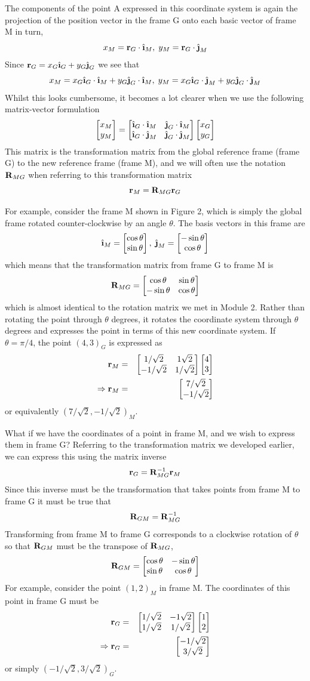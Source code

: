\documentclass[M3_Night6_Solutions]{subfiles}
\begin{document}
The components of the point A expressed in this coordinate system is again the projection of the position vector in the frame G onto each basic vector of frame M in turn,
\[x_M = \r_G \cdot \ihat_M, \; y_M = \r_G \cdot \jhat_M \]
Since $\r_G = x_G \ihat_G + y_G \jhat_G$ we see that
\[x_M = x_G \ihat_G \cdot \ihat_M + y_G \jhat_G \cdot \ihat_M, \; y_M = x_G \ihat_G \cdot \jhat_M + y_G \jhat_G \cdot \jhat_M\]
Whilst this looks cumbersome, it becomes a lot clearer when we use the following matrix-vector formulation
\[\twobyone{x_M}{y_M} = \twobytwo{\ihat_G \cdot \ihat_M}{\jhat_G \cdot \ihat_M}{\ihat_G \cdot \jhat_M}{\jhat_G \cdot \jhat_M} \twobyone{x_G}{y_G}\]
This matrix is the transformation matrix from the global reference frame (frame G) to the new reference frame (frame M), and we will often use the notation $\mathbf{R}_{MG}$ when referring to this transformation matrix
\[\mathbf{r}_M = \mathbf{R}_{MG} \mathbf{r}_G \]

For example, consider the frame M shown in Figure 2, which is simply the global frame rotated counter-clockwise by an angle $\theta$. The basis vectors in this frame are
\[ \ihat_M = \twobyone{\cos \theta}{\sin \theta}, \; \jhat_M = \twobyone{-\sin \theta}{\cos \theta} \]
which means that the transformation matrix from frame G to frame M is
\[\mathbf{R}_{MG} = \begin{bmatrix} \cos \theta & \sin \theta \\ -\sin \theta & \cos \theta\end{bmatrix} \]
which is almost identical to the rotation matrix we met in Module 2. Rather than rotating the point through $\theta$ degrees, it rotates the coordinate system through $\theta$ degrees and expresses the point in terms of this new coordinate system. If $\theta = \pi/4$, the point $(4,3)_G$ is expressed as
\begin{eqnarray*}
\mathbf{r}_M &=& \begin{bmatrix} 1/\sqrt{2} & 1\sqrt{2} \\ -1/\sqrt{2} & 1/\sqrt{2}\end{bmatrix} \begin{bmatrix} 4 \\ 3 \end{bmatrix} \\
\Rightarrow \mathbf{r}_M &=& \begin{bmatrix} 7/\sqrt{2} \\ -1/\sqrt{2} \end{bmatrix}
\end{eqnarray*}
or equivalently $(7/\sqrt{2},-1/\sqrt{2})_M$.

What if we have the coordinates of a point in frame M, and we wish to express them in frame G? Referring to the transformation matrix we developed earlier, we can express this using the matrix inverse
\[\mathbf{r}_G = \mathbf{R}_{MG}^{-1} \mathbf{r}_M \]
Since this inverse must be the transformation that takes points from frame M to frame G it must be true that
\[\mathbf{R}_{GM} = \mathbf{R}_{MG}^{-1} \]
Transforming from frame M to frame G corresponds to a clockwise rotation of $\theta$ so that $\mathbf{R}_{GM}$ must be the transpose of $\mathbf{R}_{MG}$,
\[\mathbf{R}_{GM} = \begin{bmatrix} \cos \theta & -\sin \theta \\ \sin \theta & \cos \theta\end{bmatrix} \]
For example, consider the point $(1,2)_M$ in frame M. The coordinates of this point in frame G must be
\begin{eqnarray*}
\mathbf{r}_G &=& \begin{bmatrix} 1/\sqrt{2} & -1\sqrt{2} \\ 1/\sqrt{2} & 1/\sqrt{2}\end{bmatrix} \begin{bmatrix} 1 \\ 2 \end{bmatrix} \\
\Rightarrow \mathbf{r}_G &=& \begin{bmatrix} -1/\sqrt{2} \\ 3/\sqrt{2} \end{bmatrix}
\end{eqnarray*}
or simply $(-1/\sqrt{2},3/\sqrt{2})_G$.
\end{document}
